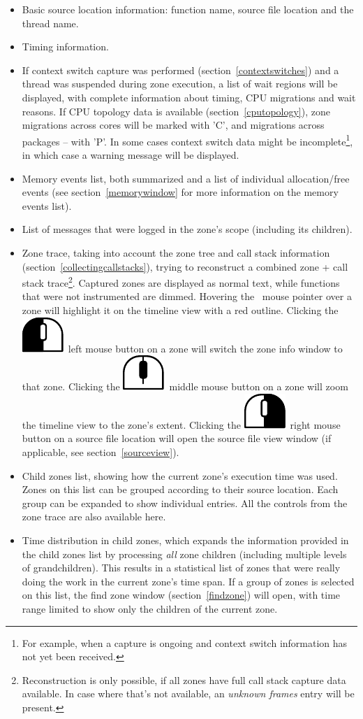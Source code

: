 \documentclass[hidelinks,titlepage,a4paper]{article}
\newcommand{\LMB}{\includegraphics[height=.8\baselineskip]{icons/lmb}}
\newcommand{\RMB}{\includegraphics[height=.8\baselineskip]{icons/rmb}}
\newcommand{\MMB}{\includegraphics[height=.8\baselineskip]{icons/mmb}}
\begin{document}
\begin{itemize}
\item Basic source location information: function name, source file location and the thread name.
\item Timing information.
\item If context switch capture was performed (section~\ref{contextswitches}) and a thread was suspended during zone execution, a list of wait regions will be displayed, with complete information about timing, CPU migrations and wait reasons. If CPU topology data is available (section~\ref{cputopology}), zone migrations across cores will be marked with 'C', and migrations across packages -- with 'P'. In some cases context switch data might be incomplete\footnote{For example, when a capture is ongoing and context switch information has not yet been received.}, in which case a warning message will be displayed.
\item Memory events list, both summarized and a list of individual allocation/free events (see section~\ref{memorywindow} for more information on the memory events list).
\item List of messages that were logged in the zone's scope (including its children).
\item Zone trace, taking into account the zone tree and call stack information (section~\ref{collectingcallstacks}), trying to reconstruct a combined zone + call stack trace\footnote{Reconstruction is only possible, if all zones have full call stack capture data available. In case where that's not available, an \emph{unknown frames} entry will be present.}. Captured zones are displayed as normal text, while functions that were not instrumented are dimmed. Hovering the \faMousePointer{}~mouse pointer over a zone will highlight it on the timeline view with a red outline. Clicking the \LMB{}~left mouse button on a zone will switch the zone info window to that zone. Clicking the \MMB{}~middle mouse button on a zone will zoom the timeline view to the zone's extent. Clicking the \RMB{}~right mouse button on a source file location will open the source file view window (if applicable, see section~\ref{sourceview}).
\item Child zones list, showing how the current zone's execution time was used. Zones on this list can be grouped according to their source location. Each group can be expanded to show individual entries. All the controls from the zone trace are also available here.
\item Time distribution in child zones, which expands the information provided in the child zones list by processing \emph{all} zone children (including multiple levels of grandchildren). This results in a statistical list of zones that were really doing the work in the current zone's time span. If a group of zones is selected on this list, the find zone window (section~\ref{findzone}) will open, with time range limited to show only the children of the current zone.
\end{itemize}
\end{document}
